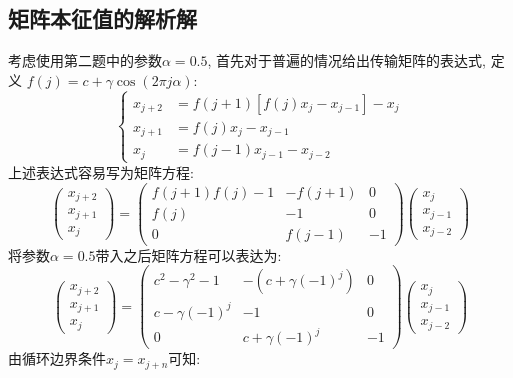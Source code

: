 \documentclass[a4paper,zihao=5,UTF8]{ctexart}
\begin{document}
	\subsection{矩阵本征值的解析解}
	考虑使用第二题中的参数$\alpha = 0.5$, 首先对于普遍的情况给出传输矩阵的表达式, 定义
	$f(j) = c + \gamma\cos(2\pi j \alpha)$:
	\begin{equation}
		\left\{
			\begin{aligned}
				x_{j + 2} &= f(j + 1)\left[f(j)x_j - x_{j - 1}\right] - x_j\\
				x_{j +1} &= f(j)x_j- x_{j - 1}\\
				x_j &= f(j - 1)x_{j - 1} - x_{j-2}
			\end{aligned}
		\right.
	\end{equation} 
	上述表达式容易写为矩阵方程:
	\begin{equation}
		\begin{pmatrix}
			x_{j+2}\\
			x_{j + 1}\\
			x_{j}
		\end{pmatrix}
		=
		\begin{pmatrix}
			f(j+1)f(j) - 1 & -f(j+1) &0 \\
			f(j) & -1 & 0\\
			0 & f(j-1) & -1
		\end{pmatrix}
		\begin{pmatrix}
			x_{j}\\
			x_{j-1}\\
			x_{j-2}
		\end{pmatrix}
	\end{equation}
	将参数$\alpha=0.5$带入之后矩阵方程可以表达为:
	\begin{equation}
		\begin{pmatrix}
			x_{j+2}\\
			x_{j + 1}\\
			x_{j}
		\end{pmatrix}
		=
		\begin{pmatrix}
			c^2 - \gamma^2 - 1 & -(c + \gamma(-1)^j) &0 \\
			c - \gamma(-1)^j & -1 & 0\\
			0 & c + \gamma(-1)^j & -1
		\end{pmatrix}
		\begin{pmatrix}
			x_{j}\\
			x_{j-1}\\
			x_{j-2}
		\end{pmatrix}
	\end{equation}
	由循环边界条件$x_j = x_{j+n}$可知:
\end{document}
